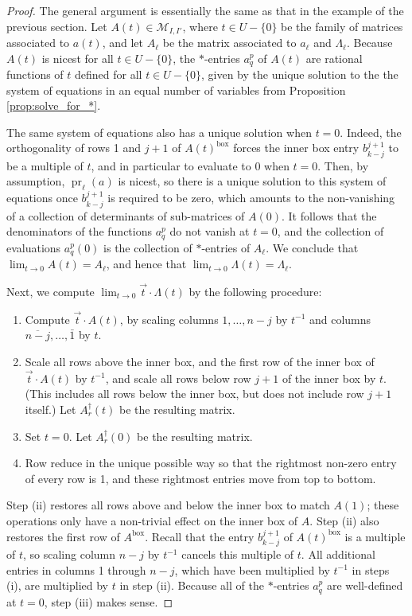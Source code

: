 \documentclass[12pt]{amsart}
\DeclareMathOperator{\inbox}{box}
\DeclareMathOperator{\pr}{pr}
\newcommand{\cM}{\mathcal{M}}
\newcommand{\vectt}{\overrightarrow{t}}
\begin{document}
\begin{proof}
The general argument is essentially the same as that in the example of the previous section. Let $A(t)\in\cM_{I,I'}$, where $t\in U-\{0\}$ be the family of matrices associated to $a(t)$, and let $A_\ell$ be the matrix associated to $a_\ell$ and $\Lambda_\ell$. Because $A(t)$ is nicest for all $t\in U-\{0\}$, the $*$-entries $a^p_q$ of $A(t)$ are rational functions of $t$ defined for all $t\in U-\{0\}$, given by the unique solution to the the system of equations in an equal number of variables from Proposition \ref{prop:solve_for_*}. 

The same system of equations also has a unique solution when $t=0$. Indeed, the orthogonality of rows 1 and $j+1$ of $A(t)^{\inbox} $ forces the inner box entry $b^{j+1}_{k-j}$ to be a multiple of $t$, and in particular to evaluate to 0 when $t=0$. Then, by assumption, $\pr_\ell(a)$ is nicest, so there is a unique solution to this system of equations once $b^{j+1}_{k-j}$ is required to be zero, which amounts to the non-vanishing of a collection of determinants of sub-matrices of $A(0)$. It follows that the denominators of the functions $a^p_q$ do not vanish at $t=0$, and the collection of evaluations $a^p_q(0)$ is the collection of $*$-entries of $A_\ell$. We conclude that $\lim_{t\to 0}A(t)=A_\ell$, and hence that $\lim_{t\to 0}\Lambda(t)=\Lambda_\ell$.

Next, we compute $\lim_{t\to 0}\vectt\cdot \Lambda(t)$ by the following procedure:
\begin{enumerate}
    \item[(i)] Compute $\vectt\cdot A(t)$, by scaling columns $1,\ldots,n-j$ by $t^{-1}$ and columns $\overline{n-j},\ldots,\bar1$ by $t$.
    \item[(ii)] Scale all rows above the inner box, and the first row of the inner box of $\vectt\cdot A(t)$ by $t^{-1}$, and scale all rows below row $j+1$ of the inner box by $t$. (This includes all rows below the inner box, but does not include row $j+1$ itself.) Let $A^\dagger_r(t)$ be the resulting matrix.
    \item[(iii)] Set $t=0$. Let $A^\dagger_r(0)$ be the resulting matrix.
    \item[(iv)] Row reduce in the unique possible way so that the rightmost non-zero entry of every row is 1, and these rightmost entries move from top to bottom.
\end{enumerate}
Step (ii) restores all rows above and below the inner box to match $A(1)$; these operations only have a non-trivial effect on the inner box of $A$. Step (ii) also restores the first row of $A^{\inbox}$. Recall that the entry $b^{j+1}_{k-j}$ of $A(t)^{\inbox}$ is a multiple of $t$, so scaling column $n-j$ by $t^{-1}$ cancels this multiple of $t$. All additional entries in columns 1 through $n-j$, which have been multiplied by $t^{-1}$ in steps (i), are multiplied by $t$ in step (ii). Because all of the $*$-entries $a^p_q$ are well-defined at $t=0$, step (iii) makes sense.


\end{proof}
\end{document}
